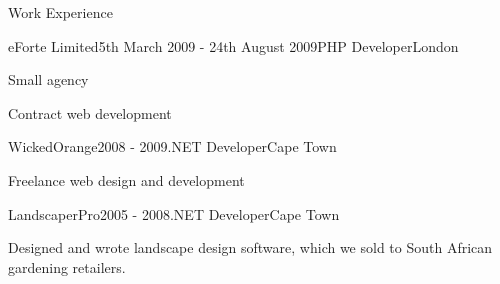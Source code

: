 \documentclass{resume}
\begin{document}
\begin{rSection}{Work Experience}
    \begin{rSubsection}{eForte Limited}{5th March 2009 - 24th August 2009}{PHP Developer}{London}
      \item Small agency
      \item Contract web development
    \end{rSubsection}

    \begin{rSubsection}{WickedOrange}{2008 - 2009}{.NET Developer}{Cape Town}
      \item Freelance web design and development
    \end{rSubsection}

    \begin{rSubsection}{LandscaperPro}{2005 - 2008}{.NET Developer}{Cape Town}
      \item Designed and wrote landscape design software, which we sold to South African gardening retailers.
    \end{rSubsection}
  \end{rSection}
\end{document}
